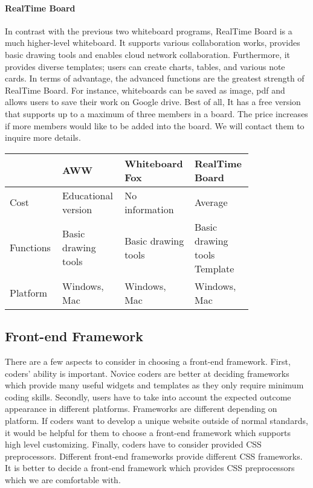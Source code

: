 \documentclass[10pt]{article}
\begin{document}
            \paragraph{RealTime Board}
                In contrast with the previous two whiteboard programs, RealTime Board is a much higher-level whiteboard. It supports various collaboration works, provides basic drawing tools and enables cloud network collaboration. Furthermore, it provides diverse templates; users can create charts, tables, and various note cards. In terms of advantage, the advanced functions are the greatest strength of RealTime Board. For instance, whiteboards can be saved as image, pdf and allows users to save their work on Google drive. Best of all, It has a free version that supports up to a maximum of three members in a board. The price increases if more members would like to be added into the board. We will contact them to inquire more details. \cite{RealTime Board Price}
                
            \begin{tabular}{ | p{0.2\linewidth} | p{0.2\linewidth} | p{0.2\linewidth} | p{0.2\linewidth} | } \hline
                 & AWW & Whiteboard Fox & RealTime Board \\ \hline
                Cost & Educational version & No information & Average \\ \hline
                Functions & Basic drawing tools & Basic drawing tools & Basic drawing tools Template \\ \hline
                Platform & Windows, Mac & Windows, Mac & Windows, Mac \\ \hline
            \end{tabular}
        
        \subsection{Front-end Framework}
            There are a few aspects to consider in choosing a front-end framework. First, coders’ ability is important. Novice coders are better at deciding frameworks which provide many useful widgets and templates as they only require minimum coding skills. Secondly, users have to take into account the expected outcome appearance in different platforms. Frameworks are different depending on platform. If coders want to develop a unique website outside of normal standards, it would be helpful for them to choose a front-end framework which supports high level customizing. Finally, coders have to consider provided CSS preprocessors. Different front-end frameworks provide different CSS frameworks. It is better to decide a front-end framework which provides CSS preprocessors which we are comfortable with. \cite{Front-end Frameworks}
        
\end{document}
